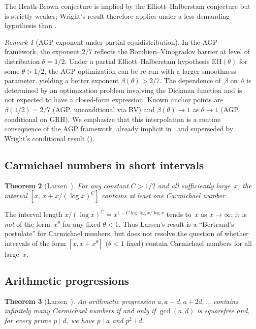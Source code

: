 \documentclass[12pt]{amsart}
\theoremstyle{plain}
\newtheorem{theorem}{Theorem}[section]
\theoremstyle{definition}
\theoremstyle{remark}
\newtheorem{remark}[theorem]{Remark}
\begin{document}
The Heath-Brown conjecture is implied by the Elliott--Halberstam
conjecture but is strictly weaker; Wright's result therefore applies
under a less demanding hypothesis than .

\begin{remark}[AGP exponent under partial equidistribution]
\label{rem:agp_partial_eh}
In the AGP framework, the exponent $2/7$ reflects the
Bombieri--Vinogradov barrier at level of distribution $\theta=1/2$.
Under a partial Elliott--Halberstam hypothesis $\mathrm{EH}(\theta)$
for some $\theta>1/2$, the AGP optimization can be re-run with a
larger smoothness parameter, yielding a better exponent
$\beta(\theta)>2/7$.  The dependence of~$\beta$ on~$\theta$ is
determined by an optimization problem involving the Dickman function
and is not expected to have a closed-form expression.  Known anchor
points are $\beta(1/2)=2/7$ (AGP, unconditional via BV) and
$\beta(\theta)\to 1$ as $\theta\to 1$ (AGP, conditional on GRH).  We
emphasize that this interpolation is a routine consequence of the AGP
framework, already implicit in~\cite{agp1994} and superseded by
Wright's conditional result ().
\end{remark}

\subsection{Carmichael numbers in short intervals}

\begin{theorem}[Larsen~\cite{larsen2023}]\label{thm:larsen}
For any constant $C>1/2$ and all sufficiently large~$x$, the interval
$[x,\, x+x/(\log x)^{C}]$ contains at least one Carmichael number.
\end{theorem}

The interval length $x/(\log x)^{C}=x^{1-C\log\log x/\log x}$ tends
to~$x$ as $x\to\infty$; it is \emph{not} of the form~$x^{\theta}$
for any fixed $\theta<1$.  Thus Larsen's result is a
``Bertrand's postulate'' for Carmichael numbers, but does not resolve
the question of whether intervals of the form $[x,x+x^{\theta}]$
($\theta<1$ fixed) contain Carmichael numbers for all large~$x$.

\subsection{Arithmetic progressions}

\begin{theorem}[Larsen~\cite{larsen2025ap}]\label{thm:larsen_ap}
An arithmetic progression $a,a+d,a+2d,\ldots$ contains infinitely
many Carmichael numbers if and only if $\gcd(a,d)$ is squarefree and,
for every prime $p\mid d$, we have $p\mid a$ and $p^{2}\nmid d$.
\end{theorem}
\end{document}
